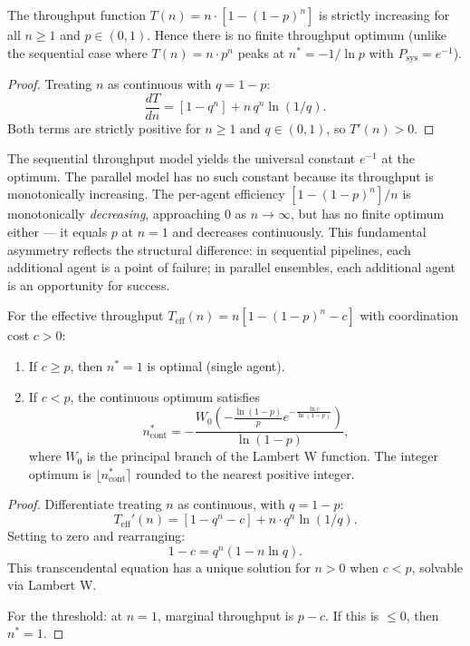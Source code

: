\begin{proposition}
\label{prop:parallel-throughput}
The throughput function $T(n) = n \cdot [1 - (1-p)^n]$ is strictly increasing for all
$n \ge 1$ and $p \in (0,1)$. Hence there is no finite throughput optimum (unlike the
sequential case where $T(n) = n \cdot p^n$ peaks at $n^* = -1/\ln p$ with $P_{\mathrm{sys}} = e^{-1}$).
\end{proposition}

\begin{proof}
Treating $n$ as continuous with $q = 1-p$:
\[
  \frac{dT}{dn} = [1 - q^n] + n\, q^n \ln(1/q).
\]
Both terms are strictly positive for $n \ge 1$ and $q \in (0,1)$, so $T'(n) > 0$.
\end{proof}

\begin{remark}
The sequential throughput model yields the universal constant $e^{-1}$ at the optimum.
The parallel model has no such constant because its throughput is monotonically increasing.
The per-agent efficiency $[1-(1-p)^n]/n$ is monotonically \emph{decreasing}, approaching $0$
as $n \to \infty$, but has no finite optimum either --- it equals $p$ at $n=1$ and decreases
continuously. This fundamental asymmetry reflects the structural difference: in sequential
pipelines, each additional agent is a point of failure; in parallel ensembles, each additional
agent is an opportunity for success.
\end{remark}

\begin{theorem}
\label{thm:parallel-throughput-cost-lambert}
For the effective throughput $T_{\mathrm{eff}}(n) = n[1-(1-p)^n - c]$ with coordination cost $c > 0$:
\begin{enumerate}
  \item If $c \ge p$, then $n^* = 1$ is optimal (single agent).
  \item If $c < p$, the continuous optimum satisfies
    \[
      n^*_{\mathrm{cont}} = -\frac{W_0\!\left(-\frac{\ln(1-p)}{p} e^{-\frac{\ln c}{\ln(1-p)}}\right)}{\ln(1-p)},
    \]
    where $W_0$ is the principal branch of the Lambert W function. The integer optimum is
    $\lfloor n^*_{\mathrm{cont}} \rceil$ rounded to the nearest positive integer.
\end{enumerate}
\end{theorem}

\begin{proof}
Differentiate treating $n$ as continuous, with $q = 1-p$:
\[
  T_{\mathrm{eff}}'(n) = [1 - q^n - c] + n \cdot q^n \ln(1/q).
\]
Setting to zero and rearranging:
\[
  1 - c = q^n(1 - n \ln q).
\]
This transcendental equation has a unique solution for $n > 0$ when $c < p$, solvable via Lambert W.

For the threshold: at $n=1$, marginal throughput is $p - c$. If this is $\le 0$, then $n^*=1$.
\end{proof}

